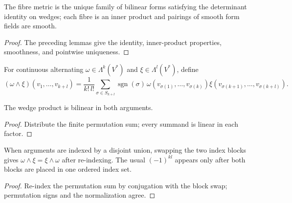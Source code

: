 \begin{proposition}
\label{prop:fiber-metric-forms}





The fibre metric is the unique family of bilinear forms satisfying the determinant identity on wedges; each fibre is an inner product and pairings of smooth form fields are smooth.
\end{proposition}
\begin{proof}

\sketch The preceding lemmas give the identity, inner-product properties, smoothness, and pointwise uniqueness.
\end{proof}

\begin{definition}
\label{def:wedge-alternating-forms}




For continuous alternating $\omega\in\Lambda^k(V^*)$ and $\xi\in\Lambda^l(V^*)$, define
\[
(\omega\wedge\xi)(v_1,\ldots,v_{k+l})=\frac1{k!\,l!}\sum_{\sigma\in S_{k+l}}\operatorname{sgn}(\sigma)\,\omega(v_{\sigma(1)},\ldots,v_{\sigma(k)})\xi(v_{\sigma(k+1)},\ldots,v_{\sigma(k+l)}).
\]
\end{definition}

\begin{lemma}
\label{lem:wedge-bilinear}





The wedge product is bilinear in both arguments.
\end{lemma}
\begin{proof}

\sketch Distribute the finite permutation sum; every summand is linear in each factor.
\end{proof}

\begin{lemma}
\label{lem:wedge-comm-sum}





When arguments are indexed by a disjoint union, swapping the two index blocks gives $\omega\wedge\xi=\xi\wedge\omega$ after re-indexing. The usual $(-1)^{kl}$ appears only after both blocks are placed in one ordered index set.
\end{lemma}
\begin{proof}

\sketch Re-index the permutation sum by conjugation with the block swap; permutation signs and the normalization agree.
\end{proof}

